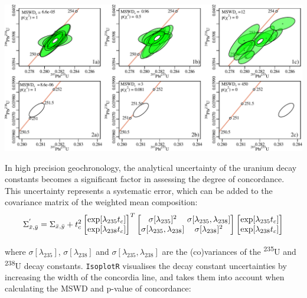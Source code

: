 \begin{refsection}
\noindent\includegraphics[width=\textwidth]{../figures/concordia_MSWD.pdf}
\begingroup {}\endgroup

In high precision geochronology, the analytical uncertainty of the
uranium decay constants becomes a significant factor in assessing the
degree of concordance. This uncertainty represents a systematic error,
which can be added to the covariance matrix of the weighted mean
composition:
\begin{equation}
  \Sigma_{\bar{x},\bar{y}}^{'} =
  \Sigma_{\bar{x},\bar{y}} + t_c^2
  \left[
    \begin{array}{@{}c@{}}
      \exp[\lambda_{235}t_c] \\
      \exp[\lambda_{238}t_c]      
    \end{array}
    \right]^T
  \left[
    \begin{array}{@{}c@{~}c@{}}
      \sigma[\lambda_{235}]^2 & \sigma[\lambda_{235},\lambda_{238}] \\
      \sigma[\lambda_{235},\lambda_{238}] & \sigma[\lambda_{238}]^2
    \end{array}
    \right]
  \left[
    \begin{array}{@{}c@{}}
      \exp[\lambda_{235}t_c]\\
      \exp[\lambda_{238}t_c]
    \end{array}
    \right]
  \label{eq:systematicUPb}
\end{equation}

\noindent where $\sigma[\lambda_{235}]$, $\sigma[\lambda_{238}]$ and
$\sigma[\lambda_{235},\lambda_{238}]$ are the (co)variances of the
\textsuperscript{235}U and \textsuperscript{238}U decay constants.
\texttt{IsoplotR} visualises the decay constant uncertainties by
increasing the width of the concordia line, and takes them into
account when calculating the MSWD and p-value of concordance:


\end{refsection}
